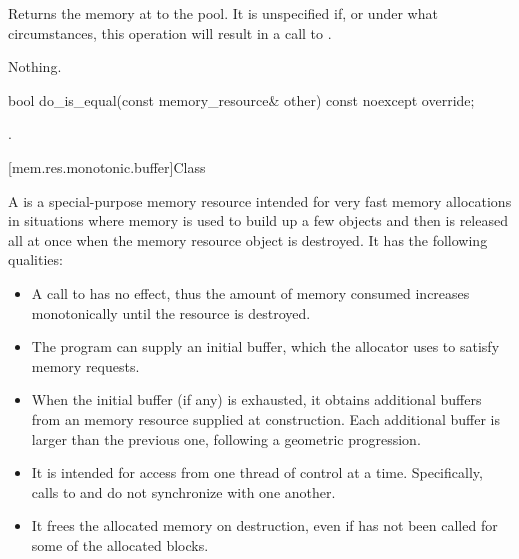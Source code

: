 \begin{itemdescr}
\pnum
\effects
Returns the memory at  to the pool.
It is unspecified if, or under what circumstances,
this operation will result in a call to .

\pnum
\throws
Nothing.
\end{itemdescr}

%
%
\begin{itemdecl}
bool do_is_equal(const memory_resource& other) const noexcept override;
\end{itemdecl}

\begin{itemdescr}
\pnum
\returns
{}.
\end{itemdescr}

[mem.res.monotonic.buffer]{Class }

\pnum
A  is a special-purpose memory resource
intended for very fast memory allocations in situations
where memory is used to build up a few objects
and then is released all at once when the memory resource object is destroyed.
It has the following qualities:
\begin{itemize}
\item
A call to  has no effect,
thus the amount of memory consumed increases monotonically
until the resource is destroyed.
\item
The program can supply an initial buffer,
which the allocator uses to satisfy memory requests.
\item
When the initial buffer (if any) is exhausted,
it obtains additional buffers from an  memory resource
supplied at construction.
Each additional buffer is larger than the previous one,
following a geometric progression.
\item
It is intended for access from one thread of control at a time.
Specifically, calls to  and 
do not synchronize with one another.
\item
It frees the allocated memory on destruction,
even if  has not been called for some of the allocated blocks.
\end{itemize}

